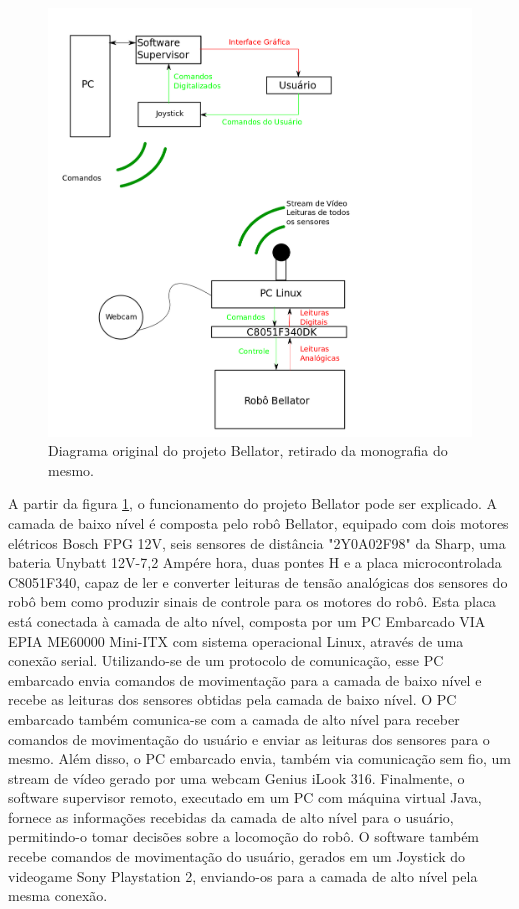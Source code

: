 \begin{figure}[!htb]
	\centering
	\includegraphics[width=\textwidth]{./figs/diagsis.png}
	\caption[Diagrama original do Bellator]{Diagrama original do projeto Bellator, retirado da monografia do mesmo.}
	\label{fig:diagsis}
\end{figure}

A partir da figura \ref{fig:diagsis}, o funcionamento do projeto Bellator pode ser explicado. A camada de baixo nível é composta pelo robô Bellator, equipado com dois motores elétricos Bosch FPG 12V, seis sensores de distância "2Y0A02F98" da Sharp, uma bateria Unybatt 12V-7,2 Ampére hora, duas pontes H e a placa microcontrolada C8051F340, capaz de ler e converter leituras de tensão analógicas dos sensores do robô bem como produzir sinais de controle para os motores do robô. Esta placa está conectada à camada de alto nível, composta por um PC Embarcado VIA EPIA ME60000 Mini-ITX com sistema operacional Linux, através de uma conexão serial. Utilizando-se de um protocolo de comunicação, esse PC embarcado envia comandos de movimentação para a camada de baixo nível e recebe as leituras dos sensores obtidas pela camada de baixo nível. O PC embarcado também comunica-se com a camada de alto nível para receber comandos de movimentação do usuário e enviar as leituras dos sensores para o mesmo. Além disso, o PC embarcado envia, também via comunicação sem fio, um stream de vídeo gerado por uma webcam Genius iLook 316. Finalmente, o software supervisor remoto, executado em um PC com máquina virtual Java, fornece as informações recebidas da camada de alto nível para o usuário, permitindo-o tomar decisões sobre a locomoção do robô. O software também recebe comandos de movimentação do usuário, gerados em um Joystick do videogame Sony Playstation 2, enviando-os para a camada de alto nível pela mesma conexão.

